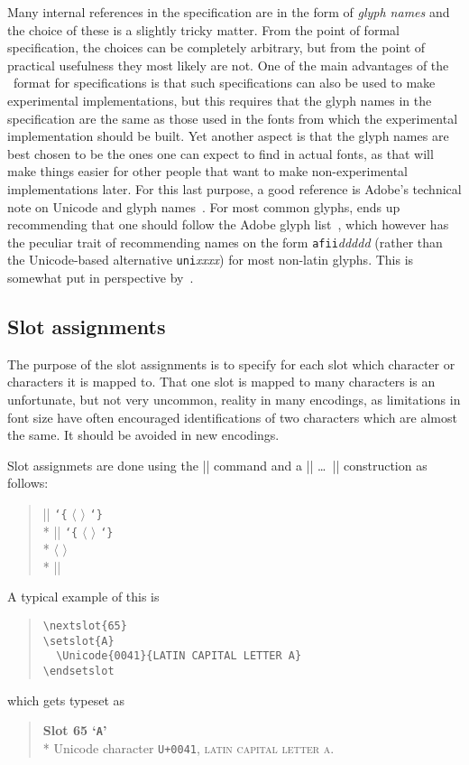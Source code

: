 \documentclass[a4paper]{article}
\makeatletter
\DeclareRobustCommand\meta[1]{%
   \ensuremath{\langle}%
   \sbox{\z@}{%
      \setlanguage\l@nohyphenation
      \normalfont\itshape #1\/%
      \setlanguage\language
   }%
   \unhbox\z@
   \ensuremath{\rangle}%
}
\DeclareRobustCommand\marg[1]{%
   \texttt{\char`\{}\meta{#1}\texttt{\char`\}}%
}
\DeclareRobustCommand\ETX{\textsmaller{ETX}}
\makeatother
\begin{document}
Many internal references in the specification are in the form of 
\emph{glyph names} and the choice of these is a slightly tricky 
matter. From the point of formal specification, the choices can be 
completely arbitrary, but from the point of practical usefulness they 
most likely are not. One of the main advantages of the \ETX\ format 
for specifications is that such specifications can also be used to 
make experimental implementations, but this requires that the glyph 
names in the specification are the same as those used in the fonts 
from which the experimental implementation should be built. Yet 
another aspect is that the glyph names are best chosen to be the ones 
one can expect to find in actual fonts, as that will make things 
easier for other people that want to make non-experimental 
implementations later. For this last purpose, a good reference is 
Adobe's technical note on Unicode and glyph names~\cite{unicodesign}. 
For most common glyphs, \cite{unicodesign} ends up recommending that 
one should follow the Adobe glyph list~\cite{AGL}, which however has 
the peculiar trait of recommending names on the form 
\texttt{afii}\textit{ddddd} (rather than the Unicode-based alternative 
\texttt{uni}\textit{xxxx}) for most non-latin glyphs. This is somewhat 
put in perspective by~\cite{ATN5013}.


\subsection{Slot assignments}

The purpose of the slot assignments is to specify for each slot which 
character or characters it is mapped to. That one slot is mapped to 
many characters is an unfortunate, but not very uncommon, reality in 
many encodings, as limitations in font size have often encouraged 
identifications of two characters which are almost the same. It should 
be avoided in new encodings.

Slot assignmets are done using the |\nextslot| command and a 
|\setslot| \dots\ |\endsetslot| construction as follows:
\begin{quote}
  |\nextslot|\marg{slot number}\\*
  |\setslot|\marg{glyph name}\\*
  \mbox{\quad}\meta{slot commands}\\*
  |\endsetslot|
\end{quote}
A typical example of this is
\begin{quote}\begin{verbatim}
\nextslot{65}
\setslot{A}
  \Unicode{0041}{LATIN CAPITAL LETTER A}
\endsetslot
\end{verbatim}\end{quote}
which gets typeset as
\begin{quote}
  \textbf{Slot 65 `\texttt{A}'}\\*
  Unicode character \texttt{U+0041}, \textsc{latin capital letter a}.
\end{quote}
\end{document}
